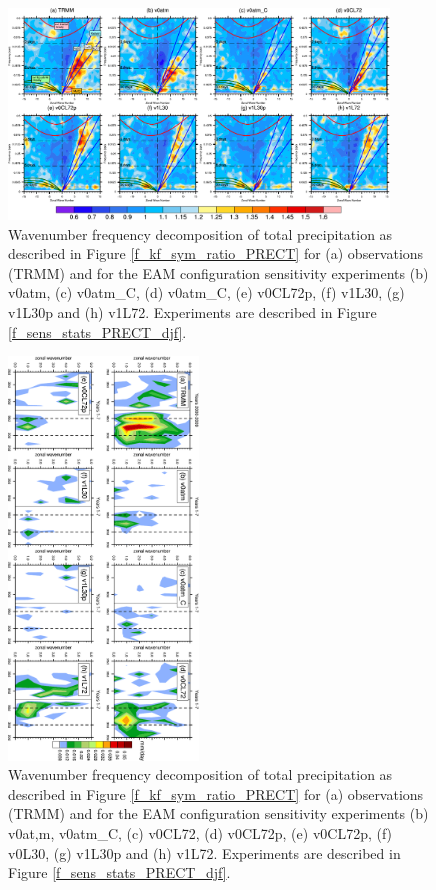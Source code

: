 \documentclass[draft,ms]{AGUTeX}
\begin{document}
\begin{article}
\begin{figure}[t]
  \begin{center}
  \noindent\includegraphics[width=0.9\textwidth,angle=0.]{./figs/f_sens_kf.pdf}
  \caption{Wavenumber frequency decomposition of total precipitation as described in Figure \ref{f_kf_sym_ratio_PRECT} for (a) observations (TRMM) and for the EAM configuration sensitivity experiments (b) v0atm, (c) v0atm\_C, (d) v0atm\_C, (e) v0CL72p, (f) v1L30, (g) v1L30p and (h) v1L72. Experiments are described in Figure \ref{f_sens_stats_PRECT_djf}. } 
  \end{center}
\label{f_sens_kf}
\end{figure}

\begin{figure}[t]
  \begin{center}
  \noindent\includegraphics[width=0.45\textwidth,angle=90.]{./figs/f_sens_spectra.pdf}
  \caption{Wavenumber frequency decomposition of total precipitation as described in Figure \ref{f_kf_sym_ratio_PRECT} for (a) observations (TRMM) and for the EAM configuration sensitivity experiments (b) v0at,m, v0atm\_C, (c) v0CL72, (d) v0CL72p, (e) v0CL72p, (f) v0L30, (g) v1L30p and (h) v1L72. Experiments are described in Figure \ref{f_sens_stats_PRECT_djf}. } 
  \end{center}
\label{f_sens_spectra}
\end{figure}


\end{article}
\end{document}
